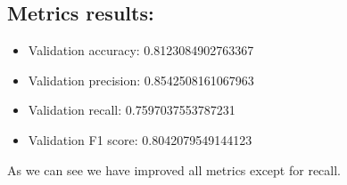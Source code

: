 \documentclass[12pt, a4paper]{article}
\begin{document}
\subsection{Metrics results:}

\begin{itemize}
  \item Validation accuracy: 0.8123084902763367
  \item Validation precision: 0.8542508161067963
  \item Validation recall: 0.7597037553787231
  \item Validation F1 score: 0.8042079549144123 \\
\end{itemize}

As we can see we have improved all metrics except for recall.
\end{document}
